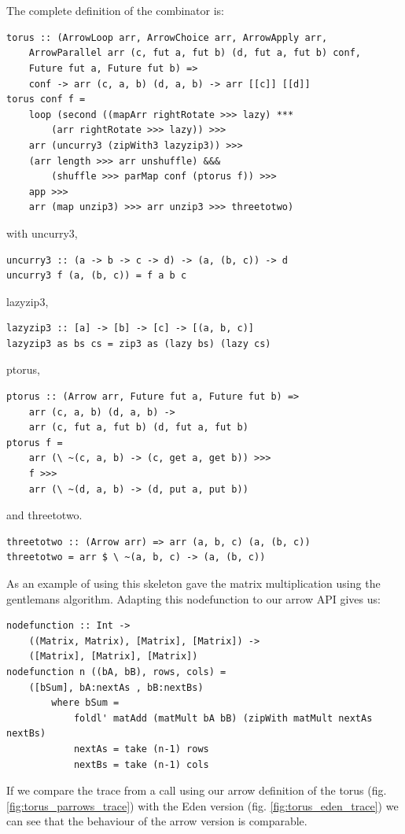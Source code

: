 \\\\
The complete definition of the  combinator is:
\begin{lstlisting}[frame=htrbl]
torus :: (ArrowLoop arr, ArrowChoice arr, ArrowApply arr,
	ArrowParallel arr (c, fut a, fut b) (d, fut a, fut b) conf,
	Future fut a, Future fut b) =>
	conf -> arr (c, a, b) (d, a, b) -> arr [[c]] [[d]]
torus conf f =
	loop (second ((mapArr rightRotate >>> lazy) ***
		(arr rightRotate >>> lazy)) >>>
	arr (uncurry3 (zipWith3 lazyzip3)) >>>
	(arr length >>> arr unshuffle) &&&
		(shuffle >>> parMap conf (ptorus f)) >>>
	app >>>
	arr (map unzip3) >>> arr unzip3 >>> threetotwo)
\end{lstlisting}
with uncurry3,
\begin{lstlisting}[frame=htrbl]
uncurry3 :: (a -> b -> c -> d) -> (a, (b, c)) -> d
uncurry3 f (a, (b, c)) = f a b c
\end{lstlisting}
lazyzip3,
\begin{lstlisting}[frame=htrbl]
lazyzip3 :: [a] -> [b] -> [c] -> [(a, b, c)]
lazyzip3 as bs cs = zip3 as (lazy bs) (lazy cs)
\end{lstlisting}
ptorus,
\begin{lstlisting}[frame=htrbl]
ptorus :: (Arrow arr, Future fut a, Future fut b) =>
	arr (c, a, b) (d, a, b) ->
	arr (c, fut a, fut b) (d, fut a, fut b)
ptorus f =
	arr (\ ~(c, a, b) -> (c, get a, get b)) >>>
	f >>>
	arr (\ ~(d, a, b) -> (d, put a, put b))
\end{lstlisting}
and threetotwo.
\begin{lstlisting}[frame=htrbl]
threetotwo :: (Arrow arr) => arr (a, b, c) (a, (b, c))
threetotwo = arr $ \ ~(a, b, c) -> (a, (b, c))
\end{lstlisting}
As an example of using this skeleton \cite{eden_cefp} gave the matrix multiplication using the gentlemans algorithm. Adapting this nodefunction to our arrow API gives us:
\begin{lstlisting}[frame=htrbl]
nodefunction :: Int ->
	((Matrix, Matrix), [Matrix], [Matrix]) ->
	([Matrix], [Matrix], [Matrix])
nodefunction n ((bA, bB), rows, cols) =
	([bSum], bA:nextAs , bB:nextBs)
		where bSum =
			foldl' matAdd (matMult bA bB) (zipWith matMult nextAs nextBs)
			nextAs = take (n-1) rows
			nextBs = take (n-1) cols
\end{lstlisting}
If we compare the trace from a call using our arrow definition of the torus (fig. \ref{fig:torus_parrows_trace}) with the Eden version (fig. \ref{fig:torus_eden_trace}) we can see that the behaviour of the arrow version is comparable.
